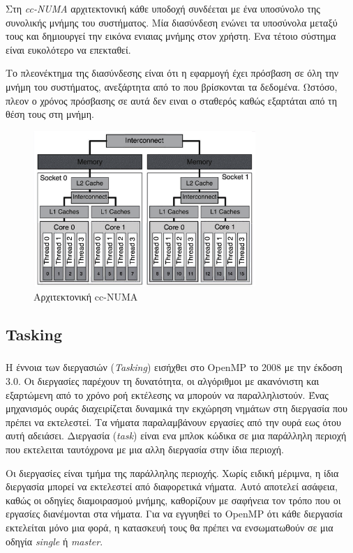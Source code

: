 \documentclass[12pt]{article}
\newcommand{\en}[1]{\foreignlanguage{english}{#1}}
\begin{document}
Στη \emph{\en{cc-NUMA}} αρχιτεκτονική κάθε υποδοχή συνδέεται με ένα υποσύνολο της συνολικής μνήμης του συστήματος. Μία διασύνδεση ενώνει τα υποσύνολα μεταξύ τους και δημιουργεί την εικόνα ενιαιας μνήμης στον χρήστη. Ενα τέτοιο σύστημα είναι ευκολότερο να επεκταθεί.

Το πλεονέκτημα της διασύνδεσης είναι ότι η εφαρμογή έχει πρόσβαση σε όλη την μνήμη του συστήματος, ανεξάρτητα από το που βρίσκονται τα δεδομένα. Ωστόσο, πλεον ο χρόνος πρόσβασης σε αυτά δεν ειναι ο σταθερός καθώς εξαρτάται από τη θέση τους στη μνήμη.


\begin{figure}[h]
\includegraphics[width=0.75\textwidth]{numa}
\centering
\captionsetup{justification=centering, singlelinecheck=false}
	\caption{Αρχιτεκτονική \en{cc-NUMA}\cite{thenextstep152}}
\label{fig:numa}
\end{figure}



\subsection{\en{Tasking}}
\subparagraph{}
Η έννοια των διεργασιών (\emph{\en{Tasking}}) εισήχθει στο \en{OpenMP} το 2008 με την έκδοση 3.0\cite{parallel_dist}.
Οι διεργασίες παρέχουν τη δυνατότητα, οι αλγόριθμοι με ακανόνιστη και εξαρτώμενη από το χρόνο ροή εκτέλεσης να μπορούν να παραλληλιστούν. Ένας μηχανισμός ουράς διαχειρίζεται δυναμικά την εκχώρηση νημάτων στη διεργασία που πρέπει να εκτελεστεί. Τα νήματα παραλαμβάνουν εργασίες από την ουρά εως ότου αυτή αδειάσει.
Διεργασία (\emph{\en{task}}) είναι ενα μπλοκ κώδικα σε μια παράλληλη περιοχή που εκτελειται ταυτόχρονα με μια αλλη διεργασία στην ίδια περιοχή. 

Οι διεργασίες είναι τμήμα της παράλληλης περιοχής.
Χωρίς ειδική μέριμνα, η ίδια διεργασία μπορεί να εκτελεστεί από διαφορετικά νήματα. Αυτό αποτελεί ασάφεια, καθώς οι οδηγίες διαμοιρασμού μνήμης, καθορίζουν με σαφήνεια τον τρόπο που οι εργασίες διανέμονται στα νήματα. Για να εγγυηθεί το \en{OpenMP} ότι κάθε διεργασία εκτελείται μόνο μια φορά, η κατασκευή τους θα πρέπει να ενσωματωθούν σε μια οδηγία \emph{\en{single}} ή \emph{\en{master}}.
\end{document}
